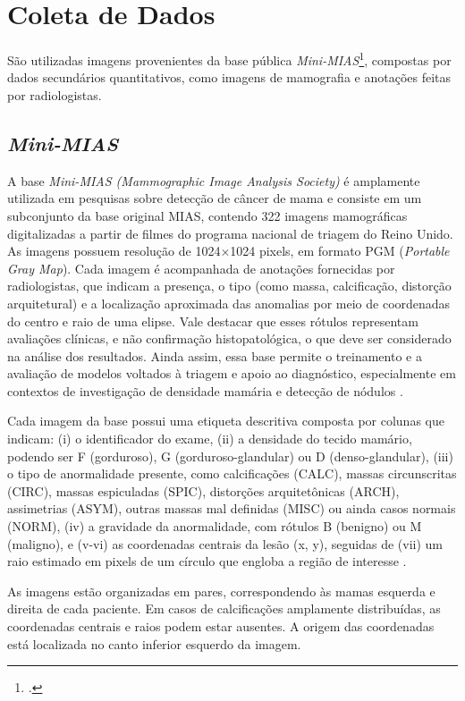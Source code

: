 \section{Coleta de Dados}

São utilizadas imagens provenientes da base pública \textit{Mini-MIAS}\footcite{https://www.kaggle.com/datasets/kmader/mias-mammography}, compostas por dados secundários quantitativos, como imagens de mamografia e anotações feitas por radiologistas. 

\subsection*{\textit{Mini-MIAS}}
A base \textit{Mini-MIAS (Mammographic Image Analysis Society)} é amplamente utilizada em pesquisas sobre detecção de câncer de mama e consiste em um subconjunto da base original MIAS, contendo 322 imagens mamográficas digitalizadas a partir de filmes do programa nacional de triagem do Reino Unido. As imagens possuem resolução de 1024×1024 pixels, em formato PGM (\textit{Portable Gray Map}). Cada imagem é acompanhada de anotações fornecidas por radiologistas, que indicam a presença, o tipo (como massa, calcificação, distorção arquitetural) e a localização aproximada das anomalias por meio de coordenadas do centro e raio de uma elipse. Vale destacar que esses rótulos representam avaliações clínicas, e não confirmação histopatológica, o que deve ser considerado na análise dos resultados. Ainda assim, essa base permite o treinamento e a avaliação de modelos voltados à triagem e apoio ao diagnóstico, especialmente em contextos de investigação de densidade mamária e detecção de nódulos \cite{MammoImageDatabases}.

Cada imagem da base possui uma etiqueta descritiva composta por colunas que indicam: (i) o identificador do exame, (ii) a densidade do tecido mamário, podendo ser F (gorduroso), G (gorduroso-glandular) ou D (denso-glandular), (iii) o tipo de anormalidade presente, como calcificações (CALC), massas circunscritas (CIRC), massas espiculadas (SPIC), distorções arquitetônicas (ARCH), assimetrias (ASYM), outras massas mal definidas (MISC) ou ainda casos normais (NORM), (iv) a gravidade da anormalidade, com rótulos B (benigno) ou M (maligno), e (v-vi) as coordenadas centrais da lesão (x, y), seguidas de (vii) um raio estimado em pixels de um círculo que engloba a região de interesse \cite{kmader_mias_2018}.

As imagens estão organizadas em pares, correspondendo às mamas esquerda e direita de cada paciente. Em casos de calcificações amplamente distribuídas, as coordenadas centrais e raios podem estar ausentes. A origem das coordenadas está localizada no canto inferior esquerdo da imagem.

